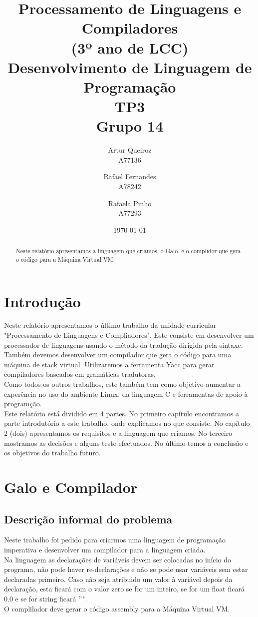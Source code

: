 \documentclass{report}
\title{Processamento de Linguagens e Compiladores\\ (3º ano de LCC)\\ \textbf{Desenvolvimento de Linguagem de Programação}\\ TP3\\ Grupo 14}
\author{Artur Queiroz\\ A77136 \and  Rafael Fernandes\\ A78242 \and Rafaela Pinho\\ A77293 }
\date{\today}
\begin{document}
	
\maketitle
	

\begin{abstract}
	Neste relatório apresentamos a linguagem que criamos, o Galo, e o complidor que gera o código para a Máquina Virtual VM.
\end{abstract}

\tableofcontents

\chapter{Introdução} \label{intro}
\indent
Neste relatório apresentamos o último trabalho da unidade curricular "Processamento de Linguagens e Compliadores". Este consiste em desenvolver um processador de linguagens usando o método da tradução dirigida pela sintaxe. Também devemos desenvolver um compilador que gera o código para uma máquina de stack virtual. Utilizaremos a ferramenta Yacc para gerar compiladores baseados em gramáticas tradutoras.\\
\indent
Como todos os outros trabalhos, este também tem como objetivo aumentar a experência no uso do ambiente Linux, da linguagem C e  ferramentas de apoio à programção.\\
\indent
Este relatório está dividido em 4 partes. No primeiro capítulo encontramos a parte introdutório a este trabalho, onde explicamos no que consiste. No capítulo 2 (dois) apresentamos os requisitos e a linguagem que criamos. No terceiro mostramos as decisões e alguns teste efectuados. No último temos a conclusão e os objetivos do trabalho futuro.
 
\chapter{Galo e Compilador} \label{fi}
\section{Descrição informal do problema}
\indent
Neste trabalho foi pedido para criarmos uma linguagem de programação imperativa e desenvolver um compilador para a linguagem criada.\\
\indent
Na linguagem as declarações de variáveis devem ser colocadas no início do programa, não pode haver re-declarações e não se pode usar variáveis sem estar declaradas primeiro. Caso não seja atribuido um valor à variável depois da declaração, esta ficará com o valor zero se for um inteiro, se for um float ficará 0.0 e se for string ficará $"$".\\
\indent  	
O complilador deve gerar o código assembly para a Máquina Virtual VM.
\end{document}
